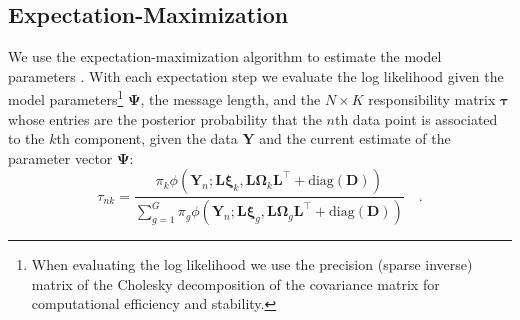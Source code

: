\documentclass[twocolumn]{aastex62}
\newcommand{\vect}[1]{\boldsymbol{\mathbf{#1}}}
\renewcommand{\vec}[1]{\vect{#1}}
\newcommand{\weight}{\pi}
\newcommand{\data}{\textbf{Y}}
\newcommand{\vecdata}{\vec\data}
\newcommand{\diag}[1]{\textrm{diag}(#1)}
\newcommand{\transpose}{^\intercal}
\newcommand{\factorloads}{\textbf{L}}
\newcommand{\specificvariance}{\vec{D}}
\newcommand{\scoremeans}{\vec\xi}
\newcommand{\scorecovs}{\vec\Omega}
\newcommand{\NumData}{N}
\newcommand{\numdata}{n}
\newcommand{\NumComponents}{K}
\newcommand{\numcomponents}{k}
\begin{document}
\subsection{Expectation-Maximization} \label{sec:expectation-maximization}

We use the expectation-maximization algorithm to estimate the model parameters
\citep{Dempster:1977}. With each expectation step we evaluate the log likelihood 
given the model parameters\footnote{When evaluating the log likelihood we use the precision (sparse inverse) matrix of the Cholesky decomposition of the covariance matrix for computational efficiency and stability.} $\vec\Psi$, the message length, and the $\NumData \times \NumComponents$ responsibility 
matrix $\vec\tau$ whose entries are the posterior probability that the 
$\numdata$th data point is associated to the $\numcomponents$th component, given 
the data $\vecdata$ and the current estimate of the parameter vector $\vec\Psi$:
\begin{equation}
	\tau_{\numdata\numcomponents} = \frac{\weight_\numcomponents\phi(\vecdata_\numdata;\factorloads\scoremeans_\numcomponents, \factorloads\scorecovs_\numcomponents\factorloads\transpose + \diag{\specificvariance})}{\sum_{g=1}^{G}\weight_g\phi(\vecdata_\numdata;\factorloads\scoremeans_g, \factorloads\scorecovs_g\factorloads\transpose + \diag{\specificvariance})} \quad .
\end{equation}
\end{document}
